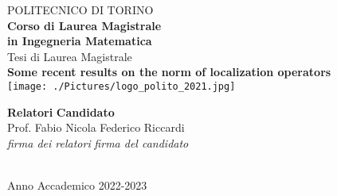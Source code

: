 \begin{titlepage}

\begin{center}

{\huge POLITECNICO DI TORINO}\\[1.5cm]
\textbf{Corso di Laurea Magistrale\\in Ingegneria Matematica}\\[3cm]

{\Large Tesi di Laurea Magistrale}\\[0.5cm]
\textbf{\LARGE Some recent results on the norm of localization operators}\\[2cm]
\texttt{[image: ./Pictures/logo\_polito\_2021.jpg]}
\vspace{4cm}


\begin{minipage}{0.85\textwidth}
\begin{flushleft}\large
\textbf{Relatori} \hfill \textbf{Candidato}\\
Prof. Fabio Nicola \hfill Federico Riccardi\\
\textit{firma dei relatori} \hfill \textit{firma del candidato}\\[0.35cm]
\fillin\ \hfill \fillin
\end{flushleft}
\end{minipage}

\vfill

Anno Accademico 2022-2023
\end{center}

\restoregeometry %

\end{titlepage}